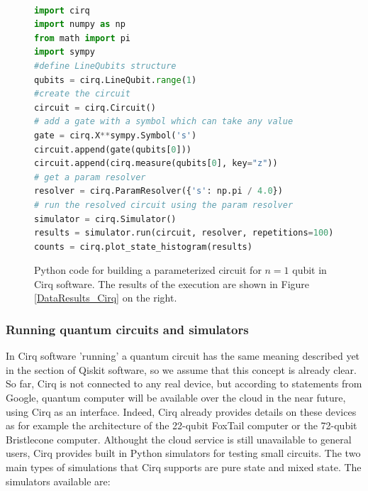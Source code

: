 \begin{figure}[h!]
\begin{lstlisting}[language=Python]%[language=Python, caption=Python example]

import cirq
import numpy as np
from math import pi
import sympy
#define LineQubits structure
qubits = cirq.LineQubit.range(1)
#create the circuit
circuit = cirq.Circuit()
# add a gate with a symbol which can take any value
gate = cirq.X**sympy.Symbol('s')
circuit.append(gate(qubits[0]))
circuit.append(cirq.measure(qubits[0], key="z"))
# get a param resolver
resolver = cirq.ParamResolver({'s': np.pi / 4.0})
# run the resolved circuit using the param resolver
simulator = cirq.Simulator()
results = simulator.run(circuit, resolver, repetitions=100)
counts = cirq.plot_state_histogram(results)
\end{lstlisting}
\caption{\label{Cirq_ParameterizedCircuit} Python code for building a parameterized circuit for $n=1$ qubit in Cirq software. The results of the execution are shown in Figure \ref{DataResults_Cirq} on the right.}
\end{figure}

\subsubsection{Running quantum circuits and simulators}

In Cirq software 'running' a quantum circuit has the same meaning described yet in the section of Qiskit software, so we assume that this concept is already clear. So far, Cirq is not connected to any real device, but according to statements from Google, quantum computer will be available over the cloud in the near future, using Cirq as an interface. Indeed, Cirq already provides details on these devices as for example the architecture of the 22-qubit FoxTail computer or the 72-qubit Bristlecone computer. Althought the cloud service is still unavailable to general users, Cirq provides built in Python simulators for testing small circuits. The two main types of simulations that Cirq supports are pure state and mixed state. The simulators available are:

